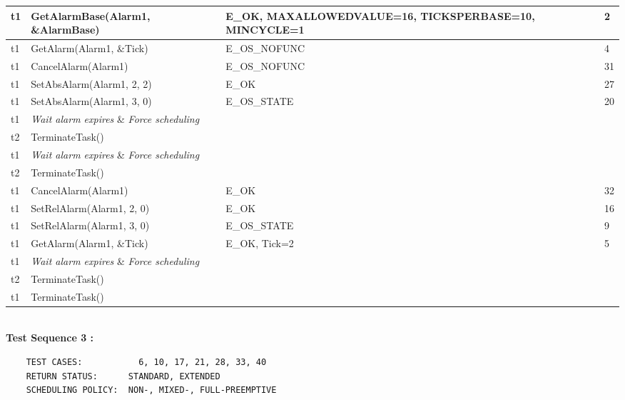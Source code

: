 \documentclass[10pt]{article}
\newlength{\Li}\settowidth{\Li}{Running}
\newlength{\Lii}\setlength{\Lii}{7cm}
\newlength{\Liiii}\setlength{\Liiii}{0.9cm}
\newlength{\Liii}\setlength{\Liii}{\textwidth} \addtolength{\Liii}{-\Li} \addtolength{\Liii}{-\Lii} \addtolength{\Liii}{-\Liiii}
\begin{document}
	\begin{supertabular}{|p{\Li}|p{\Lii}|p{\Liii}|p{\Liiii}|} \hline 
	t1 & GetAlarmBase(Alarm1, \&AlarmBase) 				& E\_OK, MAXALLOWEDVALUE=16, TICKSPERBASE=10, MINCYCLE=1	& 2 \\ \hline 
	t1 & GetAlarm(Alarm1, \&Tick)							& E\_OS\_NOFUNC 	& 4 \\ \hline 
	t1 & CancelAlarm(Alarm1) 							& E\_OS\_NOFUNC 	& 31 \\ \hline 
	t1 & SetAbsAlarm(Alarm1, 2, 2)							& E\_OK 			& 27 \\ \hline 
	t1 & SetAbsAlarm(Alarm1, 3, 0) 						& E\_OS\_STATE 	& 20 \\ \hline
	t1 & \textit{Wait alarm expires} \& \textit{Force scheduling} 	& 				& \\ \hline 
	t2 & TerminateTask() 								& 				& \\ \hline 
	t1 & \textit{Wait alarm expires} \& \textit{Force scheduling} 	& 				& \\ \hline 
	t2 & TerminateTask() 								& 				& \\ \hline 
	t1 & CancelAlarm(Alarm1)							& E\_OK 			& 32 \\ \hline  
	t1 & SetRelAlarm(Alarm1, 2, 0)							& E\_OK 			& 16 \\ \hline 
	t1 & SetRelAlarm(Alarm1, 3, 0) 						& E\_OS\_STATE 	& 9 \\ \hline 
	t1 & GetAlarm(Alarm1, \&Tick)							& E\_OK, Tick=2 	& 5 \\ \hline 
	t1 & \textit{Wait alarm expires} \& \textit{Force scheduling} 	& 				& \\ \hline 
	t2 & TerminateTask()								& 				& \\ \hline 
	t1 & TerminateTask()								& 				& \\ \hline 
	\end{supertabular} \\

	\textbf{Test Sequence 3 :}
	\begin{lstlisting}
	TEST CASES:		      6, 10, 17, 21, 28, 33, 40
	RETURN STATUS:	    STANDARD, EXTENDED
	SCHEDULING POLICY:  NON-, MIXED-, FULL-PREEMPTIVE
	\end{lstlisting}
	
	
\end{document}
